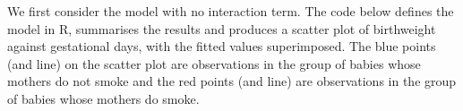 \documentclass[letterpaper,10pt,english]{jupyterBook}
\begin{document}
\sphinxAtStartPar
We first consider the model with no interaction term. The code below defines the model in R, summarises the results and produces a scatter plot of birthweight against gestational days, with the fitted values superimposed. The blue points (and line) on the scatter plot are observations in the group of babies whose mothers do not smoke and the red points (and line) are observations in the group of babies whose mothers do smoke.

\begin{sphinxVerbatim}[commandchars=\\\{\}]
 
\PYG{p}{[}\PYG{p}{]}



\end{sphinxVerbatim}
\end{document}
